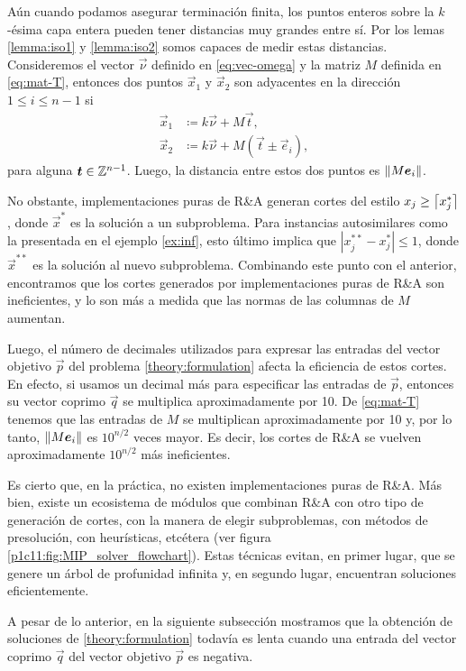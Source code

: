 Aún cuando podamos asegurar terminación finita, los puntos enteros sobre la $k$-ésima capa entera
pueden tener distancias muy grandes entre sí. Por los lemas \ref{lemma:iso1} y \ref{lemma:iso2}
somos capaces de medir estas distancias. Consideremos el vector $\vec{\nu}$ definido en
\eqref{eq:vec-omega} y la matriz $M$ definida en \eqref{eq:mat-T}, entonces dos puntos $\vec{x}_1$ y
$\vec{x}_2$ son adyacentes en la dirección $1 \leq i \leq n - 1$ si
\begin{align*}
	\vec{x}_1 &\coloneq k\vec{\nu} + M\vec{t}, \\
	\vec{x}_2 &\coloneq k\vec{\nu} + M(\vec{t} \pm \vec{e}_i),
\end{align*}
para alguna $\boldsymbol{t} \in \mathbb{Z}^{n-1}$. Luego, la distancia entre estos dos puntos es
$\left\lVert M\boldsymbol{e}_i \right\rVert$.

No obstante, implementaciones puras de R\&A generan cortes del estilo $x_j \geq \left\lceil x_j^* \right\rceil$, donde
$\vec{x}^*$ es la solución a un subproblema. Para instancias autosimilares como la presentada en el
ejemplo \ref{ex:inf}, esto último implica que $|x_j^{**} - x_j^*| \leq 1$, donde $\vec{x}^{**}$ es
la solución al nuevo subproblema. Combinando este punto con el anterior, encontramos que los cortes
generados por implementaciones puras de R\&A son ineficientes, y lo son más a medida que las normas
de las columnas de $M$ aumentan.

Luego, el número de decimales utilizados para expresar las entradas del vector objetivo $\vec{p}$ del problema
\eqref{theory:formulation} afecta la eficiencia de estos cortes. En efecto, si usamos
un decimal más para especificar las entradas de $\vec{p}$, entonces su vector coprimo $\vec{q}$ se
multiplica aproximadamente por 10. De \eqref{eq:mat-T} tenemos que las entradas de $M$ se
multiplican aproximadamente por 10 y, por lo tanto, $\left\lVert M\boldsymbol{e}_i \right\rVert$ es $10^{n/2}$ veces mayor.
Es decir, los cortes de R\&A se vuelven aproximadamente $10^{n/2}$ más ineficientes.

Es cierto que, en la práctica, no existen implementaciones puras de R\&A. Más bien, existe un
ecosistema de módulos que combinan R\&A con otro tipo de generación de cortes, con la manera de
elegir subproblemas, con métodos de presolución, con heurísticas, etcétera (ver figura
\ref{p1c11:fig:MIP_solver_flowchart}). Estas técnicas evitan, en primer lugar, que se genere un
árbol de profunidad infinita y, en segundo lugar, encuentran soluciones eficientemente.

A pesar de lo anterior, en la siguiente subsección mostramos que la obtención de soluciones de
\eqref{theory:formulation} todavía es lenta cuando una entrada del vector coprimo $\vec{q}$ del
vector objetivo $\vec{p}$ es negativa.

